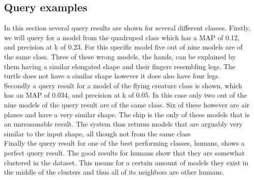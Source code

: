 \documentclass{bigdata}
\begin{document}
\subsection{Query examples}
In this section several query results are shown for several different classes. Firstly, we will query for a model from the quadruped class which has a MAP of 0.12, and precision at k of 0.23. For this specific model five out of nine models are of the same class. Three of these wrong models, the hands, can be explained by them having a similar elongated shape and their fingers resembling legs. The turtle does not have a similar shape however it does also have four legs.  \\
Secondly a query result for a model of the flying creature class is shown, which has an MAP of 0.034, and precision at k of 0.05. In this case only two out of the nine models of the query result are of the same class. Six of these however are air planes and have a very similar shape. The ship is the only of these models that is an unreasonable result. The system thus returns models that are arguably very similar to the input shape, all though not from the same class \\
Finally the query result for one of the best performing classes, humans, shows a perfect query result. The good results for humans show that they are somewhat clustered in the dataset. This means for a certain amount of models they exist in the middle of the clusters and thus all of its neighbors are other humans. \\
\end{document}
